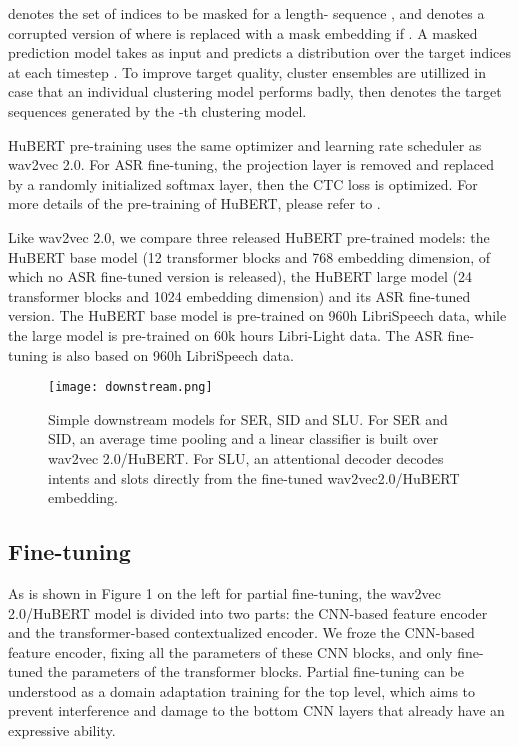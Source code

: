 \documentclass{article}
\begin{document}
 denotes the set of indices to be masked for a length- sequence , and  denotes a corrupted version of  where  is replaced with a mask embedding  if . A masked prediction model  takes as input  and predicts a distribution over the target indices at each timestep . To improve target quality, cluster ensembles are utillized in case that an individual clustering model performs badly,  then denotes the target sequences generated by the -th clustering model.

HuBERT pre-training uses the same optimizer and learning rate scheduler as wav2vec 2.0. For ASR fine-tuning, the projection layer is removed and replaced by a randomly initialized softmax layer, then the CTC loss is optimized. For more details of the pre-training of HuBERT, please refer to \cite{HuBERT}.

Like wav2vec 2.0, we compare three released HuBERT pre-trained models: the HuBERT base model (12 transformer blocks and 768 embedding dimension, of which no ASR fine-tuned version is released), the HuBERT large model (24 transformer blocks and 1024 embedding dimension) and its ASR fine-tuned version. The HuBERT base model is pre-trained on 960h LibriSpeech data, while the large model is pre-trained on 60k hours Libri-Light \cite{LibriLight} data. The ASR fine-tuning is also based on 960h LibriSpeech data.

\begin{figure}[t]
  \centering
  \texttt{[image: downstream.png]}
  \caption{Simple downstream models for SER, SID and SLU. For SER and SID, an average time pooling and a linear classifier is built over wav2vec 2.0/HuBERT. For SLU, an attentional decoder decodes intents and slots directly from the fine-tuned wav2vec2.0/HuBERT embedding.}
  \label{fig:speech_production}
\end{figure}

\subsection{Fine-tuning}
As is shown in Figure 1 on the left for partial fine-tuning, the wav2vec 2.0/HuBERT model is divided into two parts: the CNN-based feature encoder and the transformer-based contextualized encoder. We froze the CNN-based feature encoder, fixing all the parameters of these CNN blocks, and only fine-tuned the parameters of the transformer blocks. Partial fine-tuning can be understood as a domain adaptation training for the top level, which aims to prevent interference and damage to the bottom CNN layers that already have an expressive ability.
\end{document}
